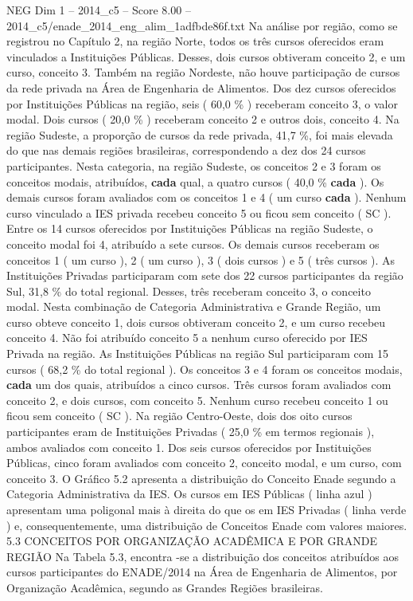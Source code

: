 \begin{textsample}{NEG Dim 1 – 2014\_c5 – Score 8.00 – 2014\_c5/enade\_2014\_eng\_alim\_1adfbde86f.txt}
Na análise por região, como se registrou no Capítulo 2, na região Norte, todos os três cursos oferecidos eram vinculados a Instituições Públicas.
Desses, dois cursos obtiveram conceito 2, e um curso, conceito 3.
Também na região Nordeste, não houve participação de cursos da rede privada na Área de Engenharia de Alimentos.
Dos dez cursos oferecidos por Instituições Públicas na região, seis ( 60,0 \% ) receberam conceito 3, o valor modal.
Dois cursos ( 20,0 \% ) receberam conceito 2 e outros dois, conceito 4.
Na região Sudeste, a proporção de cursos da rede privada, 41,7 \%, foi mais elevada do que nas demais regiões brasileiras, correspondendo a dez dos 24 cursos participantes.
Nesta categoria, na região Sudeste, os conceitos 2 e 3 foram os conceitos modais, atribuídos, \textbf{cada} qual, a quatro cursos ( 40,0 \% \textbf{cada} ).
Os demais cursos foram avaliados com os conceitos 1 e 4 ( um curso \textbf{cada} ).
Nenhum curso vinculado a IES privada recebeu conceito 5 ou ficou sem conceito ( SC ).
Entre os 14 cursos oferecidos por Instituições Públicas na região Sudeste, o conceito modal foi 4, atribuído a sete cursos.
Os demais cursos receberam os conceitos 1 ( um curso ), 2 ( um curso ), 3 ( dois cursos ) e 5 ( três cursos ).
As Instituições Privadas participaram com sete dos 22 cursos participantes da região Sul, 31,8 \% do total regional.
Desses, três receberam conceito 3, o conceito modal.
Nesta combinação de Categoria Administrativa e Grande Região, um curso obteve conceito 1, dois cursos obtiveram conceito 2, e um curso recebeu conceito 4.
Não foi atribuído conceito 5 a nenhum curso oferecido por IES Privada na região.
As Instituições Públicas na região Sul participaram com 15 cursos ( 68,2 \% do total regional ).
Os conceitos 3 e 4 foram os conceitos modais, \textbf{cada} um dos quais, atribuídos a cinco cursos.
Três cursos foram avaliados com conceito 2, e dois cursos, com conceito 5.
Nenhum curso recebeu conceito 1 ou ficou sem conceito ( SC ).
Na região Centro-Oeste, dois dos oito cursos participantes eram de Instituições Privadas ( 25,0 \% em termos regionais ), ambos avaliados com conceito 1.
Dos seis cursos oferecidos por Instituições Públicas, cinco foram avaliados com conceito 2, conceito modal, e um curso, com conceito 3.
O Gráfico 5.2 apresenta a distribuição do Conceito Enade segundo a Categoria Administrativa da IES.
Os cursos em IES Públicas ( linha azul ) apresentam uma poligonal mais à direita do que os em IES Privadas ( linha verde ) e, consequentemente, uma distribuição de Conceitos Enade com valores maiores. 5.3 CONCEITOS POR ORGANIZAÇÃO ACADÊMICA E POR GRANDE REGIÃO Na Tabela 5.3, encontra -se a distribuição dos conceitos atribuídos aos cursos participantes do ENADE/2014 na Área de Engenharia de Alimentos, por Organização Acadêmica, segundo as Grandes Regiões brasileiras.

\end{textsample}
